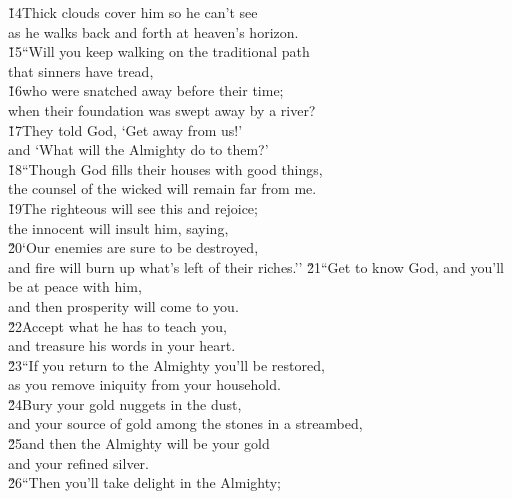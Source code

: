 \begin{poetry}
\poeml \v{14}Thick clouds cover him so he can't see \\
\poemll    as he walks back and forth at heaven's horizon. \\
\poeml \v{15}``Will you keep walking on the traditional path \\
\poemll    that sinners have tread, \\
\poeml \v{16}who were snatched away before their time; \\
\poemll    when their foundation was swept away by a river? \\
\poeml \v{17}They told God, `Get away from us!' \\
\poemll    and `What will the Almighty do to them?' \\
\poeml \v{18}``Though God fills their houses with good things, \\
\poemll    the counsel of the wicked will remain far from me. \\
\poeml \v{19}The righteous will see this and rejoice; \\
\poemll    the innocent will insult him, saying, \\
\poeml \v{20}`Our enemies are sure to be destroyed, \\
\poemll    and fire will burn up what's left of their riches.''
\poeml \v{21}``Get to know God, and you'll be at peace with him, \\
\poemll    and then prosperity will come to you. \\
\poeml \v{22}Accept what he has to teach you, \\
\poemll    and treasure his words in your heart. \\
\poeml \v{23}``If you return to the Almighty you'll be restored, \\
\poemll    as you remove iniquity from your household. \\
\poeml \v{24}Bury your gold nuggets in the dust, \\
\poemll    and your source of gold among the stones in a streambed, \\
\poeml \v{25}and then the Almighty will be your gold \\
\poemll    and your refined silver. \\
\poeml \v{26}``Then you'll take delight in the Almighty; \\

\end{poetry}

